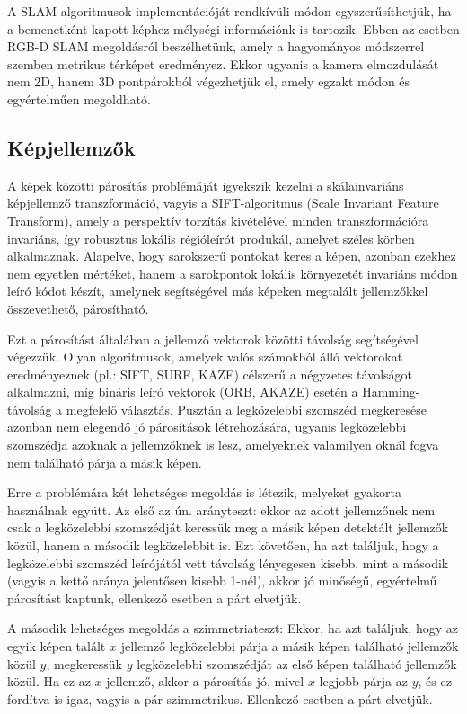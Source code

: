 \documentclass[12pt,a4paper,oneside]{report}             %
\begin{document}
A SLAM algoritmusok implementációját rendkívüli módon egyszerűsíthetjük, ha a bemenetként kapott képhez mélységi információnk is tartozik. Ebben az esetben RGB-D SLAM megoldásról beszélhetünk, amely a hagyományos módszerrel szemben metrikus térképet eredményez. Ekkor ugyanis a kamera elmozdulását nem 2D, hanem 3D pontpárokból végezhetjük el, amely egzakt módon és egyértelműen megoldható. 


\subsection{Képjellemzők}

A képek közötti párosítás problémáját igyekszik kezelni a skálainvariáns képjellemző transzformáció, vagyis a SIFT-algoritmus (Scale Invariant Feature Transform), amely a perspektív torzítás kivételével minden transzformációra invariáns, így robusztus lokális régióleírót produkál, amelyet széles körben alkalmaznak. Alapelve, hogy sarokszerű pontokat keres a képen, azonban ezekhez nem egyetlen mértéket, hanem a sarokpontok lokális környezetét invariáns módon leíró kódot készít, amelynek segítségével más képeken megtalált jellemzőkkel összevethető, párosítható.

Ezt a párosítást általában a jellemző vektorok közötti távolság segítségével végezzük. Olyan algoritmusok, amelyek valós számokból álló vektorokat eredményeznek (pl.: SIFT, SURF, KAZE) célszerű a négyzetes távolságot alkalmazni, míg bináris leíró vektorok (ORB, AKAZE) esetén a Hamming-távolság a megfelelő választás. Pusztán a legközelebbi szomszéd megkeresése azonban nem elegendő jó párosítások létrehozására, ugyanis legközelebbi szomszédja azoknak a jellemzőknek is lesz, amelyeknek valamilyen oknál fogva nem található párja a másik képen.

Erre a problémára két lehetséges megoldás is létezik, melyeket gyakorta használnak együtt. Az első az ún. arányteszt: ekkor az adott jellemzőnek nem csak a legközelebbi szomszédját keressük meg a másik képen detektált jellemzők közül, hanem a második legközelebbit is. Ezt követően, ha azt találjuk, hogy a legközelebbi szomszéd leírójától vett távolság lényegesen kisebb, mint a második (vagyis a kettő aránya jelentősen kisebb 1-nél), akkor jó minőségű, egyértelmű párosítást kaptunk, ellenkező esetben a párt elvetjük.

A második lehetséges megoldás a szimmetriateszt: Ekkor, ha azt találjuk, hogy az egyik képen talált $x$ jellemző legközelebbi párja a másik képen található jellemzők közül $y$, megkeressük $y$ legközelebbi szomszédját az első képen található jellemzők közül. Ha ez az $x$ jellemző, akkor a párosítás jó, mivel $x$ legjobb párja az $y$, és ez fordítva is igaz, vagyis a pár szimmetrikus. Ellenkező esetben a párt elvetjük.
\end{document}
